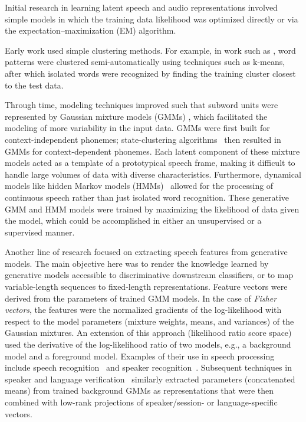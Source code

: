 Initial research in learning latent speech and audio representations involved
simple models in which the training data likelihood was optimized directly
or via the expectation--maximization (EM) algorithm.

Early work used simple clustering methods. For example, in work such
as \cite{Rabiner1979,Wilpon1985}, word patterns were clustered
semi-automatically using techniques such as k-means, after which isolated words
were recognized by finding the training cluster closest to 
  the test data.   %

Through time, modeling techniques improved such that subword units were
represented by Gaussian mixture models (GMMs) \cite{Gauvain1994}, which facilitated
the modeling of more variability in the input data. GMMs were first built for
context-independent phonemes; state-clustering 
algorithms~\cite{Young1994} then resulted in GMMs for context-dependent phonemes. 
Each latent component of these mixture models acted as a template of a
prototypical speech frame, 
  making it difficult to handle             %
large volumes of data with diverse characteristics. 
Furthermore, dynamical models like hidden Markov models (HMMs)~\cite{Bahl1986}
allowed for the processing of continuous speech rather than just isolated word
recognition. These generative GMM and HMM models were trained by maximizing the
likelihood of data given the model, which could be accomplished in either an
unsupervised or a supervised manner.

Another line of research focused on extracting speech features from generative
models. The main objective here was to render the knowledge learned by generative
models accessible to discriminative downstream classifiers, or to map
variable-length sequences to fixed-length representations. Feature vectors
were derived from the parameters of trained GMM models. In the case of {\em
Fisher vectors}, the features were the normalized gradients of the
log-likelihood with respect to the model parameters (mixture weights, means, and
variances) of the Gaussian mixtures. An extension of this approach (likelihood
ratio score space) used the derivative of the log-likelihood ratio of two
models, e.g., a background model and a foreground model. Examples of their use
in speech processing include speech recognition~\cite{smith01,venkata03} and
speaker recognition~\cite{wan03}. Subsequent techniques in speaker and language
verification~\cite{dehak11a,dehak11b} similarly extracted parameters
(concatenated means) from trained background GMMs as representations that were
then combined with low-rank projections of speaker/session- or language-specific
vectors.



